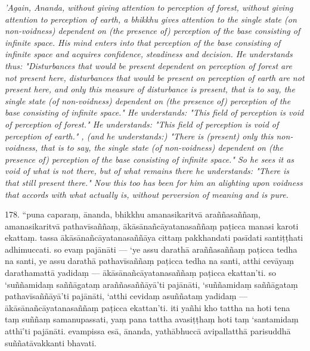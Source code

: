 \documentclass[12pt]{book}
\begin{document}
\begin{paracol}{2}
\begin{column}
\begin{flushleft}
 \switchcolumn*
	\end{flushleft} 
{\itshape\footnotesize  'Again, Ananda, without giving attention to perception of forest, without giving attention to perception of earth, a bhikkhu gives attention to the single state (on non-voidness) dependent on (the presence of) perception of the base consisting of infinite space. His mind enters into that perception of the base consisting of infinite space and acquires confidence, steadiness and decision. He understands thus: "Disturbances that would be present dependent on perception of forest are not present here, disturbances that would be present on perception of earth are not present here, and only this measure of disturbance is present, that is to say, the single state (of non-voidness) dependent on (the presence of) perception of the base consisting of infinite space." He understands: "This field of perception is void of perception of forest." He understands: "This field of perception is void of perception of earth." , (and he understands:) "There is (present) only this non-voidness, that is to say, the single state (of non-voidness) dependent on (the presence of) perception of the base consisting of infinite space." So he sees it as void of what is not there, but of what remains there he understands: "There is that still present there." Now this too has been for him an alighting upon voidness that accords with what actually is, without perversion of meaning and is pure.}
\switchcolumn
 	\begin{flushleft}
 178. “puna caparaṃ, ānanda, bhikkhu amanasikaritvā araññasaññaṃ, amanasikaritvā pathavīsaññaṃ, ākāsānañcāyatanasaññaṃ paṭicca manasi karoti ekattaṃ. tassa ākāsānañcāyatanasaññāya cittaṃ pakkhandati pasīdati santiṭṭhati adhimuccati. so evaṃ pajānāti — ‘ye assu darathā araññasaññaṃ paṭicca tedha na santi, ye assu darathā pathavīsaññaṃ paṭicca tedha na santi, atthi cevāyaṃ darathamattā yadidaṃ — ākāsānañcāyatanasaññaṃ paṭicca ekattan’ti. so ‘suññamidaṃ saññāgataṃ araññasaññāyā’ti pajānāti, ‘suññamidaṃ saññāgataṃ pathavīsaññāyā’ti pajānāti, ‘atthi cevidaṃ asuññataṃ yadidaṃ — ākāsānañcāyatanasaññaṃ paṭicca ekattan’ti. iti yañhi kho tattha na hoti tena taṃ suññaṃ samanupassati, yaṃ pana tattha avasiṭṭhaṃ hoti taṃ ‘santamidaṃ atthī’ti pajānāti. evampissa esā, ānanda, yathābhuccā avipallatthā parisuddhā suññatāvakkanti bhavati.
\switchcolumn*
	\end{flushleft}

\end{column}
\end{paracol}
\end{document}
